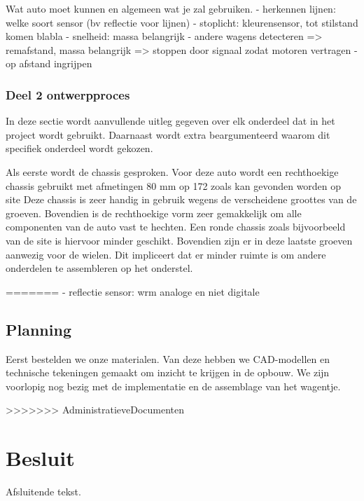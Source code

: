 \documentclass[a4paper,twoside,kulak]{kulakreport} %
\begin{document}
Wat auto moet kunnen en algemeen wat je zal gebruiken.
- herkennen lijnen: welke soort sensor (bv reflectie voor lijnen)
- stoplicht: kleurensensor, tot stilstand komen blabla
- snelheid: massa belangrijk
- andere wagens detecteren => remafstand, massa belangrijk => stoppen door signaal zodat motoren vertragen
- op afstand ingrijpen 

\subsection{Deel 2 ontwerpproces}

In deze sectie wordt aanvullende uitleg gegeven over elk onderdeel dat in het project wordt gebruikt. Daarnaast wordt extra beargumenteerd waarom dit specifiek onderdeel wordt gekozen.

Als eerste wordt de chassis gesproken. Voor deze auto wordt een rechthoekige chassis gebruikt met afmetingen 80 mm op 172 zoals kan gevonden worden op site %
Deze chassis is zeer handig in gebruik wegens de verscheidene groottes van de groeven. Bovendien is de rechthoekige vorm zeer gemakkelijk om alle componenten van de auto vast te hechten. Een ronde chassis zoals bijvoorbeeld van de site %
is hiervoor minder geschikt. Bovendien zijn er in deze laatste groeven aanwezig voor de wielen. Dit impliceert dat er minder ruimte is om andere onderdelen te assembleren op het onderstel. 






=======
- reflectie sensor: wrm analoge en niet digitale
\section{Planning}
Eerst bestelden we onze materialen. Van deze hebben we CAD-modellen en technische tekeningen gemaakt om inzicht te krijgen in de opbouw. We zijn voorlopig nog bezig met de implementatie en de assemblage van het wagentje.





>>>>>>> AdministratieveDocumenten
\chapter*{Besluit}
Afsluitende tekst.




\end{document}
